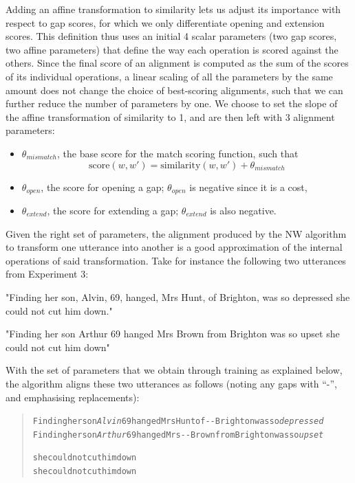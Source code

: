 Adding an affine transformation to similarity lets us adjust its
importance with respect to gap scores, for which we only differentiate
opening and extension scores. This definition thus uses an initial 4
scalar parameters (two gap scores, two affine parameters) that define
the way each operation is scored against the others. Since the final
score of an alignment is computed as the sum of the scores of its
individual operations, a linear scaling of all the parameters by the
same amount does not change the choice of best-scoring alignments, such
that we can further reduce the number of parameters by one. We choose to
set the slope of the affine transformation of similarity to 1, and are
then left with 3 alignment parameters:

\begin{itemize}
\item
  \(\theta_{mismatch}\), the base score for the match scoring function,
  such that
  \[\text{score}(w, w') = \text{similarity}(w, w') + \theta_{mismatch}\]
\item
  \(\theta_{open}\), the score for opening a gap; \(\theta_{open}\) is
  negative since it is a cost,
\item
  \(\theta_{extend}\), the score for extending a gap;
  \(\theta_{extend}\) is also negative.
\end{itemize}

Given the right set of parameters, the alignment produced by the NW
algorithm to transform one utterance into another is a good
approximation of the internal operations of said transformation. Take
for instance the following two utterances from Experiment 3:

\begin{nquote} %
  "Finding her son, Alvin, 69, hanged, Mrs Hunt, of Brighton, was so depressed she could not cut him down."
\end{nquote}\begin{nquote} %
  "Finding her son Arthur 69 hanged Mrs Brown from Brighton was so upset she could not cut him down"
\end{nquote}

With the set of parameters that we obtain through training as explained
below, the algorithm aligns these two utterances as follows (noting any
gaps with \enquote{-}, and emphasising replacements):

\begin{quote}\begin{alltt}\small
Finding her son \emph{\textcolor{Sepia}{Alvin}}  69 hanged Mrs \textcolor{BrickRed}{Hunt of} -     -    Brighton was so \emph{\textcolor{Sepia}{depressed}}
Finding her son \emph{\textcolor{Sepia}{Arthur}} 69 hanged Mrs -    -  \textcolor{OliveGreen}{Brown from} Brighton was so \emph{\textcolor{Sepia}{upset}}

she could not cut him down
she could not cut him down
\end{alltt}\end{quote}

